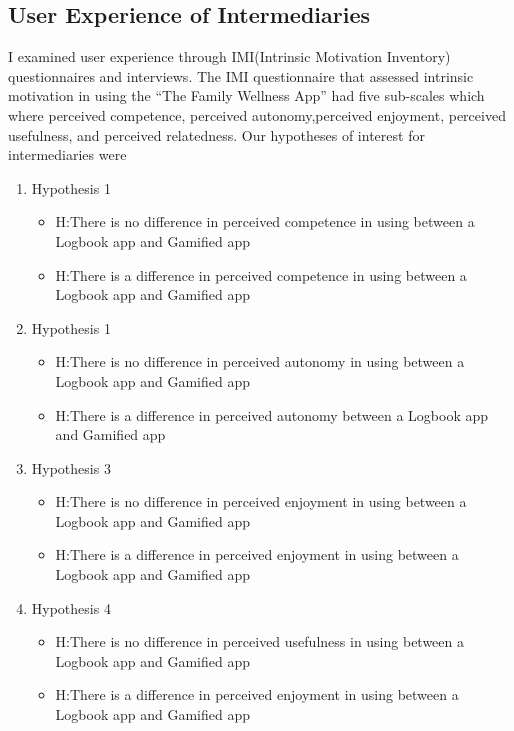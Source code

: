 \subsection{User Experience of Intermediaries}
I examined user experience through IMI(Intrinsic Motivation Inventory) questionnaires and interviews. The IMI questionnaire that assessed intrinsic motivation in using the ``The Family Wellness App'' had five sub-scales which where perceived competence, perceived autonomy,perceived enjoyment, perceived usefulness, and perceived relatedness.  
Our hypotheses of interest for intermediaries were
\begin{enumerate}
\item{Hypothesis 1}
\begin{itemize}
\item{H}:There is no difference in perceived competence in using  between a Logbook app and Gamified app
\item{H}:There is a difference in perceived competence in using  between a Logbook app and Gamified app
\end{itemize}
\item{Hypothesis 1}
\begin{itemize}
\item{H}:There is no difference in perceived autonomy in using between a Logbook app and Gamified app
\item{H}:There is a difference in perceived autonomy between a Logbook app and Gamified app
\end{itemize}
\item{Hypothesis 3}
\begin{itemize}
\item{H}:There is no difference in perceived enjoyment in using  between a Logbook app and Gamified app
\item{H}:There is a difference in perceived enjoyment in using between a Logbook app and Gamified app
\end{itemize}
\item{Hypothesis 4}
\begin{itemize}
\item{H}:There is no difference in perceived usefulness in using between a Logbook app and Gamified app
\item{H}:There is a difference in perceived enjoyment in using between a Logbook app and Gamified app
\end{itemize}
\end{enumerate}

